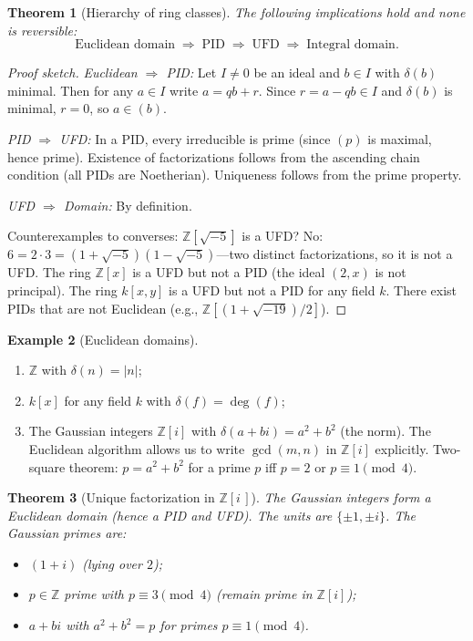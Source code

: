 \documentclass[12pt,a4paper]{amsart}
\newtheorem{theorem}{Theorem}[section]
\theoremstyle{definition}
\newtheorem{example}[theorem]{Example}
\theoremstyle{definition}
\begin{document}
\begin{theorem}[Hierarchy of ring classes]\label{thm:hierarchy}
The following implications hold and none is reversible:
\[
  \text{Euclidean domain} \;\Rightarrow\; \text{PID} \;\Rightarrow\; \text{UFD}
  \;\Rightarrow\; \text{Integral domain}.
\]
\end{theorem}

\begin{proof}[Proof sketch]
\textit{Euclidean $\Rightarrow$ PID:} Let $I \neq 0$ be an ideal and $b \in I$
with $\delta(b)$ minimal. Then for any $a \in I$ write $a = qb + r$. Since
$r = a - qb \in I$ and $\delta(b)$ is minimal, $r = 0$, so $a \in (b)$.

\textit{PID $\Rightarrow$ UFD:} In a PID, every irreducible is prime (since
$(p)$ is maximal, hence prime). Existence of factorizations follows from
the ascending chain condition (all PIDs are Noetherian). Uniqueness follows from
the prime property.

\textit{UFD $\Rightarrow$ Domain:} By definition.

Counterexamples to converses: $\mathbb{Z}[\sqrt{-5}]$ is a UFD? No: $6 = 2 \cdot 3 =
(1+\sqrt{-5})(1-\sqrt{-5})$---two distinct factorizations, so it is not a UFD.
The ring $\mathbb{Z}[x]$ is a UFD but not a PID (the ideal $(2,x)$ is not principal).
The ring $k[x,y]$ is a UFD but not a PID for any field $k$.
There exist PIDs that are not Euclidean (e.g., $\mathbb{Z}[(1+\sqrt{-19})/2]$).
\end{proof}

\begin{example}[Euclidean domains]
\begin{enumerate}[label=(\alph*)]
  \item $\mathbb{Z}$ with $\delta(n) = |n|$;
  \item $k[x]$ for any field $k$ with $\delta(f) = \deg(f)$;
  \item The Gaussian integers $\mathbb{Z}[i]$ with $\delta(a+bi) = a^2 + b^2$
        (the norm). The Euclidean algorithm allows us to write $\gcd(m,n)$ in
        $\mathbb{Z}[i]$ explicitly. Two-square theorem: $p = a^2 + b^2$ for a prime
        $p$ iff $p = 2$ or $p \equiv 1 \pmod 4$.
\end{enumerate}
\end{example}

\begin{theorem}[Unique factorization in {$\mathbb{Z}[i\,]$}]
The Gaussian integers form a Euclidean domain (hence a PID and UFD). The units are
$\{\pm 1, \pm i\}$. The Gaussian primes are:
\begin{itemize}
  \item $(1+i)$ (lying over $2$);
  \item $p \in \mathbb{Z}$ prime with $p \equiv 3 \pmod 4$ (remain prime in $\mathbb{Z}[i]$);
  \item $a + bi$ with $a^2 + b^2 = p$ for primes $p \equiv 1 \pmod 4$.
\end{itemize}
\end{theorem}
\end{document}
